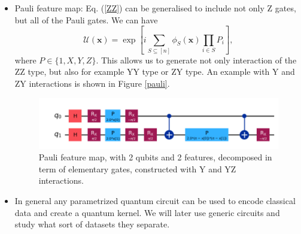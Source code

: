 \documentclass[a4paper]{article}
\begin{document}
\begin{itemize}
    \item Pauli feature map: Eq. (\ref{ZZ}) can be generalised to include not only Z gates, but all of the Pauli gates. We can have
    \begin{equation}
        \mathcal{U}(\mathbf{x})=\exp\left[i\sum_{S\subseteq [n]}\phi_S(\mathbf{x})\prod_{i\in S}P_i\right],
        \label{pauli}
    \end{equation}
    where $P\in\{1,X,Y,Z\}$. This allows us to generate not only interaction of the ZZ type, but also for example YY type or ZY type. An example with Y and ZY interactions is shown in Figure \ref{pauli}.
    \begin{figure}[h!]
        \centering
        \includegraphics[width=\textwidth]{images/pauli.png}
        \caption{Pauli feature map, with 2 qubits and 2 features, decomposed in term of elementary gates, constructed with Y and YZ interactions.}
        \label{fig:Pauli}
    \end{figure}
    \item In general any parametrized quantum circuit can be used to encode classical data and create a quantum kernel. We will later use generic circuits and study what sort of datasets they separate.
\end{itemize}
\end{document}
